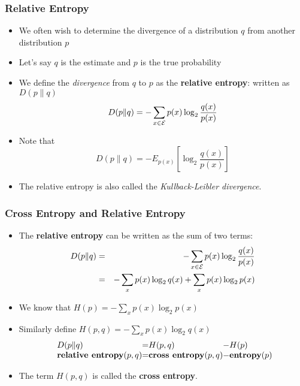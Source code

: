 \begin{frame}
\frametitle{Relative Entropy}
\begin{itemize}[<+->]
\item We often wish to determine the divergence of a distribution $q$ from another distribution $p$
\item Let's say $q$ is the estimate and $p$ is the true probability
\item We define the {\em divergence} from $q$ to $p$ as the {\bf relative entropy}: written as $D(p \| q)$
\[ D(p \| q) = - \sum_{x \in {\cal E}} p(x) \log_2 \frac{q(x)}{p(x)} \]
\item Note that
\[ D(p \| q) = - E_{ p(x) } \left[ \log_2 \frac{q(x)}{p(x)} \right] \]
\item The relative entropy is also called the {\em Kullback-Leibler divergence}.
\end{itemize}

\end{frame}

\begin{frame}
\frametitle{Cross Entropy and Relative Entropy}
\begin{itemize}[<+->]
\item The {\bf relative entropy} can be written as the sum of two terms:
\begin{eqnarray*}
D(p \| q) & = & - \sum_{x \in {\cal E}} p(x) \log_2 \frac{q(x)}{p(x)} \\
& = & - \sum_{x} p(x) \log_2 q(x) + \sum_{x} p(x) \log_2 p(x) 
\end{eqnarray*}
\item We know that $H(p) = - \sum_{x} p(x) \log_2 p(x)$
\item Similarly define $H(p,q) = - \sum_{x} p(x) \log_2 q(x)$
\[
\begin{array}{l@{}c@{}l@{}c@{}l@{}}
D(p \| q) & = & H(p,q) & - & H(p) \\
\textbf{relative entropy}(p,q) & = & \textbf{cross entropy}(p,q) & - & \textbf{entropy}(p) 
\end{array}
\]
\item The term $H(p,q)$ is called the {\bf cross entropy}.
\end{itemize}

\end{frame}

